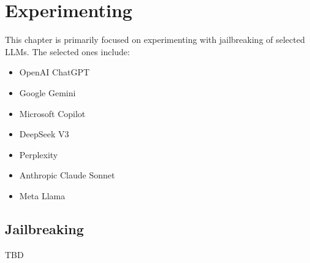 \chapter{Experimenting}

This chapter is primarily focused on experimenting with jailbreaking of selected LLMs. The selected ones include:
\begin{itemize}
    \item OpenAI ChatGPT
    \item Google Gemini
    \item Microsoft Copilot
    \item DeepSeek V3
    \item Perplexity
    \item Anthropic Claude Sonnet
    \item Meta Llama
\end{itemize}



\section{Jailbreaking}
TBD



